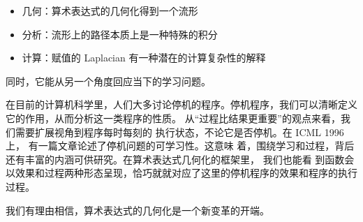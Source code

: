 \documentclass[a4paper,12pt]{article}
\numberwithin{definition}{section}
\numberwithin{lemma}{section}
\numberwithin{proposition}{section}
\numberwithin{theorem}{section}
\numberwithin{grammar}{section}
\numberwithin{program}{section}
\numberwithin{convention}{section}
\numberwithin{corollary}{section}
\begin{document}
\begin{itemize}
    \item 几何：算术表达式的几何化得到一个流形
    \item 分析：流形上的路径本质上是一种特殊的积分
    \item 计算：赋值的 Laplacian 有一种潜在的计算复杂性的解释
\end{itemize}

同时，它能从另一个⻆度回应当下的学习问题。

在目前的计算机科学里，人们大多讨论停机的程序。停机程序，我们可以清晰定义它的作用，从而分析这一类程序的性质。
从“过程比结果更重要”的观点来看，我们需要扩展视⻆到程序每时每刻的 执行状态，不论它是否停机。在 ICML 1996 上，
有一篇文章论述了停机问题的可学习性。这意味 着，围绕学习和过程，背后还有丰富的内涵可供研究。在算术表达式几何化的框架里，
我们也能看 到函数会以效果和过程两种形态呈现，恰巧就就对应了这里的停机程序的效果和程序的执行过程。

我们有理由相信，算术表达式的几何化是一个新变革的开端。

\newpage
{}
{}


\end{document}
